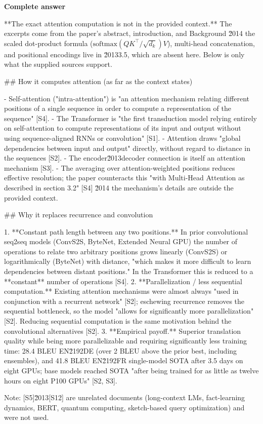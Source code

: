 \documentclass[10pt]{article}
\begin{document}
\textbf{Complete answer}
\begin{AnswerText}
**The exact attention computation is not in the provided context.** The excerpts come from the paper's abstract, introduction, and  Background \u2014 the scaled dot-product formula ($\mathrm{softmax}(QK^\top/\sqrt{d_k})V$), multi-head concatenation, and positional encodings live in \u20133.5, which are absent here. Below is only what the supplied sources support.

## How it computes attention (as far as the context states)

- Self-attention ("intra-attention") is "an attention mechanism relating different positions of a single sequence in order to compute a representation of the sequence" [S4].
- The Transformer is "the first transduction model relying entirely on self-attention to compute representations of its input and output without using sequence-aligned RNNs or convolution" [S1].
- Attention draws "global dependencies between input and output" directly, without regard to distance in the sequences [S2].
- The encoder\u2013decoder connection is itself an attention mechanism [S3].
- The averaging over attention-weighted positions reduces effective resolution; the paper counteracts this "with Multi-Head Attention as described in section 3.2" [S4] \u2014 the mechanism's details are outside the provided context.

## Why it replaces recurrence and convolution

1. **Constant path length between any two positions.** In prior convolutional seq2seq models (ConvS2S, ByteNet, Extended Neural GPU) the number of operations to relate two arbitrary positions grows linearly (ConvS2S) or logarithmically (ByteNet) with distance, "which makes it more difficult to learn dependencies between distant positions." In the Transformer this is reduced to a **constant** number of operations [S4].
2. **Parallelization / less sequential computation.** Existing attention mechanisms were almost always "used in conjunction with a recurrent network" [S2]; eschewing recurrence removes the sequential bottleneck, so the model "allows for significantly more parallelization" [S2]. Reducing sequential computation is the same motivation behind the convolutional alternatives [S2].
3. **Empirical payoff.** Superior translation quality while being more parallelizable and requiring significantly less training time: 28.4 BLEU EN\u2192DE (over 2 BLEU above the prior best, including ensembles), and 41.8 BLEU EN\u2192FR single-model SOTA after 3.5 days on eight GPUs; base models reached SOTA "after being trained for as little as twelve hours on eight P100 GPUs" [S2, S3].

Note: [S5]\u2013[S12] are unrelated documents (long-context LMs, fact-learning dynamics, BERT, quantum computing, sketch-based query optimization) and were not used.
\end{AnswerText}
\end{document}
